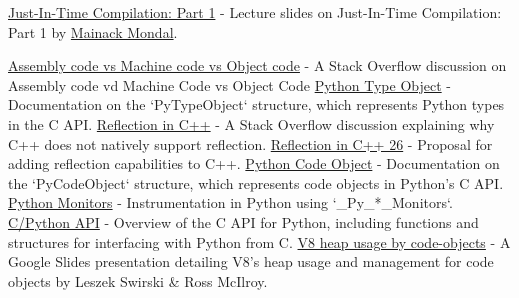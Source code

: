 \documentclass[11pt,paper=a4,answers]{exam}
\begin{document}
\begin{thebibliography}{9}

    \href{https://kronos-192081.github.io/DOCS-2024/slides/T03_JIT.pdf} {Just-In-Time Compilation: Part 1} - Lecture slides on Just-In-Time Compilation: Part 1 by \href{https://cse.iitkgp.ac.in/~mainack//}{Mainack Mondal}.

    \href{https://stackoverflow.com/questions/466790/assembly-code-vs-machine-code-vs-object-code}{Assembly code vs Machine code vs Object code} - A Stack Overflow discussion on Assembly code vd Machine Code vs Object Code
    \href{https://docs.python.org/3/c-api/type.html#c.PyTypeObject}{Python Type Object} - Documentation on the `PyTypeObject` structure, which represents Python types in the C API.
    \href{https://stackoverflow.com/questions/359237/why-does-c-not-have-reflection}{Reflection in C++} - A Stack Overflow discussion explaining why C++ does not natively support reflection.
    \href{https://www.open-std.org/jtc1/sc22/wg21/docs/papers/2023/p2996r0.html}{Reflection in C++ 26} - Proposal for adding reflection capabilities to C++.
    \href{https://docs.python.org/3/c-api/code.html}{Python Code Object} - Documentation on the `PyCodeObject` structure, which represents code objects in Python's C API.
    \href{https://github.com/python/cpython/blob/main/Include/cpython/code.h}{Python Monitors} - Instrumentation in Python using `\_Py\_*\_Monitors`.
    \href{https://docs.python.org/3/c-api/}{C/Python API} - Overview of the C API for Python, including functions and structures for interfacing with Python from C.
    \href{https://docs.google.com/presentation/d/1chhN90uB8yPaIhx_h2M3lPyxPgdPmkADqSNAoXYQiVE/edit?usp=sharing}{V8 heap usage by code-objects} - A Google Slides presentation detailing V8's heap usage and management for code objects by Leszek Swirski \& Ross McIlroy.
\end{thebibliography}
\end{document}
